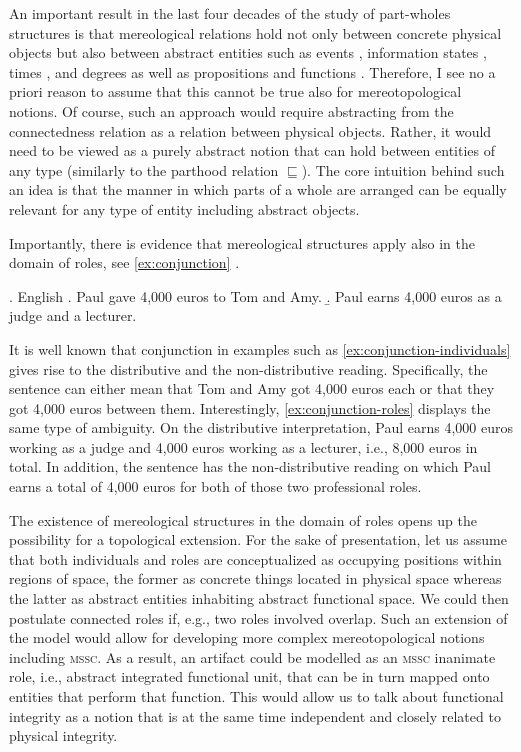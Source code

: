 	An important result in the last four decades of the study of part-wholes structures is that mereological relations hold not only between concrete physical objects but also between abstract entities such as events \citep{bach1986algebra}, information states \citep{krifka1996parametrized}, times \citep{arstein_francez2003plural}, and degrees \citep{dotlacil_nouwen2016comparative} as well as propositions \citep{lahiri2002questions} and functions \citep{schmitt2013more,schmitt2019pluralities}. Therefore, I see no a priori reason to assume that this cannot be true also for mereotopological notions. Of course, such an approach would require abstracting from the connectedness relation  as a relation between physical objects. Rather, it would need to be viewed as a purely abstract notion that can hold between entities of any type (similarly to the parthood relation $\sqsubseteq$). The core intuition behind such an idea is that the manner in which parts of a whole are arranged can be equally relevant for any type of entity including abstract objects.
	
	Importantly, there is evidence that mereological structures apply also in the domain of roles, see \ref{ex:conjunction}  \citep{wagiel-toappear-slavic}. 
	
	\ex. English \citep{wagiel-toappear-slavic}\label{ex:conjunction} 
	\a. Paul gave 4,000 euros to Tom and Amy.\label{ex:conjunction-individuals}
    \b. Paul earns 4,000 euros as a judge and a lecturer.\label{ex:conjunction-roles}
	
	It is well known that conjunction in examples such as \ref{ex:conjunction-individuals} gives rise to the distributive and the non-distributive reading. Specifically, the sentence can either mean that Tom and Amy got 4,000 euros each or that they got 4,000 euros between them. Interestingly, \ref{ex:conjunction-roles} displays the same type of ambiguity. On the distributive interpretation, Paul earns 4,000 euros working as a judge and 4,000 euros working as a lecturer, i.e., 8,000 euros in total. In addition, the sentence has the non-distributive reading on which Paul earns a total of 4,000 euros for both of those two professional roles.
	
	The existence of mereological structures in the domain of roles opens up the possibility for a topological extension. For the sake of presentation, let us assume that both individuals and roles are conceptualized as occupying positions within regions of space, the former as concrete things located in physical space whereas the latter as abstract entities inhabiting abstract functional space. We could then postulate connected roles if, e.g., two roles involved overlap. Such an extension of the model would allow for developing more complex mereotopological notions including \textsc{mssc}. As a result, an artifact could be modelled as an \textsc{mssc} inanimate role, i.e., abstract integrated functional unit, that can be in turn mapped onto entities that perform that function. This would allow us to talk about functional integrity as a notion that is at the same time independent and closely related to physical integrity.
	
